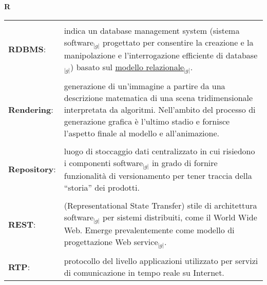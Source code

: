 \hfill\Huge{\textbf{R}}\\
\normalsize
	\begin{longtable}{p{} p{}} 
	    \toprule
	    \\
	    \textbf{RDBMS}:		&	indica un database management system (sistema software$_{|g|}$ progettato per consentire la creazione e la manipolazione e l'interrogazione efficiente  di database$_{|g|}$) basato sul \underline{modello relazionale}$_{|g|}$.\\
	    \\
	    \textbf{Rendering}:		&	generazione di un’immagine a partire da una descrizione matematica di una scena tridimensionale interpretata da algoritmi. 
						Nell’ambito del processo di generazione grafica è l’ultimo stadio e fornisce l’aspetto finale al modello e all’animazione.\\
	    \\
	    \textbf{Repository}:	&	luogo di stoccaggio dati centralizzato in cui risiedono i componenti software$_{|g|}$ in grado di fornire 
						funzionalità di versionamento per tener traccia della “storia” dei prodotti.\\
	    \\
	    \textbf{REST}: 		&	(Representational State Transfer) stile di architettura software$_{|g|}$ per sistemi distribuiti, come il World Wide Web. Emerge prevalentemente come modello di progettazione Web service$_{|g|}$.\\
	    \\
	    \textbf{RTP}: 		&	protocollo del livello applicazioni utilizzato per servizi di comunicazione in tempo reale su Internet.\\
	\end{longtable}
\newpage


